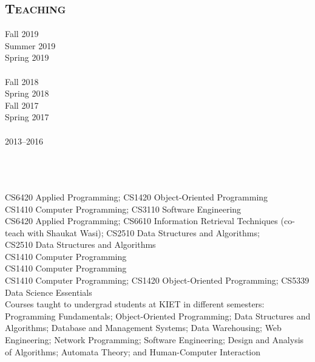 \documentclass[a4paper, 10pt]{article}
\begin{document}
\subsection*{\normalfont\textsc{\bf Teaching}}
\hfill\begin{minipage}{0.23\textwidth}
Fall 2019\textcolor{lightgray}{\dotfill}\\
Summer 2019\textcolor{lightgray}{\dotfill}\\
Spring 2019\textcolor{lightgray}{\dotfill}\\\\
Fall 2018\textcolor{lightgray}{\dotfill}\\
Spring 2018\textcolor{lightgray}{\dotfill}\\
Fall 2017\textcolor{lightgray}{\dotfill}\\
Spring 2017\textcolor{lightgray}{\dotfill}\\\\
2013--2016\textcolor{lightgray}{\dotfill}\\\\\\\\
\end{minipage}
\begin{minipage}{0.75\textwidth}
CS6420 Applied Programming; CS1420 Object-Oriented Programming\\
CS1410 Computer Programming; CS3110 Software Engineering\\
CS6420 Applied Programming; CS6610 Information Retrieval Techniques (co-teach with Shaukat Wasi); CS2510 Data Structures and Algorithms;\\
CS2510 Data Structures and Algorithms\\
CS1410 Computer Programming\\
CS1410 Computer Programming\\
CS1410 Computer Programming; CS1420 Object-Oriented Programming; CS5339 Data Science Essentials\\
Courses taught to undergrad students at KIET in different semesters: Programming Fundamentals; Object-Oriented Programming; Data Structures and Algorithms; Database and Management Systems; Data Warehousing; Web Engineering; Network Programming; Software Engineering; Design and Analysis of Algorithms; Automata Theory; and Human-Computer Interaction
\end{minipage}
\end{document}
